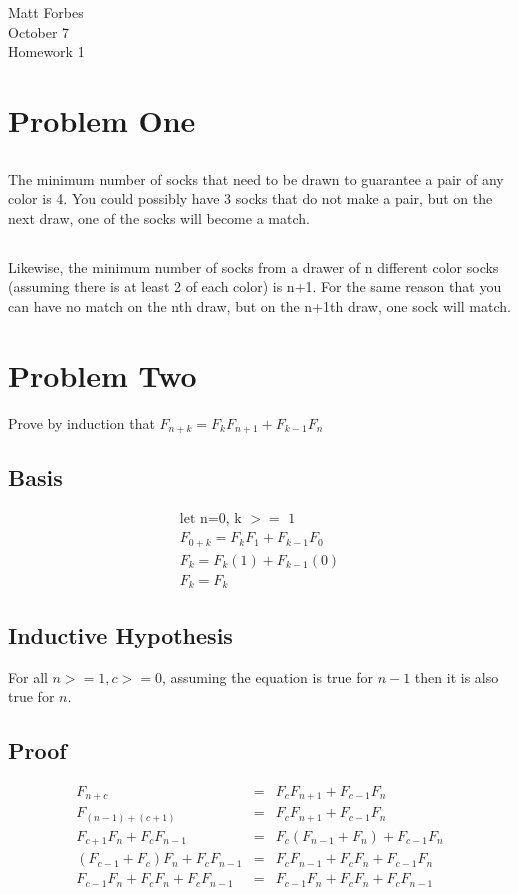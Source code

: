 \documentclass[a4paper,12pt]{article}
\begin{document}
\noindent Matt Forbes \\
October 7 \\
Homework 1 \\


\section{Problem One}
\subsection{}
The minimum number of socks that need to be drawn to guarantee a pair of any color is 4.
You could possibly have 3 socks that do not make a pair, but on the next draw, one of the 
socks will become a match.
\subsection{}
Likewise, the minimum number of socks from a drawer of n different color socks (assuming there is at least 2 of each color)
is n+1. For the same reason that you can have no match on the nth draw, but on the n+1th draw, one sock will match.

\section{Problem Two}
Prove by induction that \(F_{n+k} = F_kF_{n+1} + F_{k-1}F_n\)
\subsection{Basis}
\begin{align*}
  \text{let n=0, k \(>=\) 1} \\
  F_{0+k} = F_kF_1 + F_{k-1}F_0 \\
  F_k = F_k(1) + F_{k-1}(0) \\
  F_k = F_k
\end{align*}

\subsection{Inductive Hypothesis}
For all \(n >= 1, c >= 0 \), assuming the equation is true for \(n-1\) then it 
is also true for \(n\).

\subsection{Proof}
\begin{eqnarray*}
  F_{n+c} &=& F_cF_{n+1} + F_{c-1}F_n \\
  F_{(n-1) + (c+1)} &=& F_cF_{n+1} + F_{c-1}F_n \\
  F_{c+1}F_n + F_cF_{n-1} &=& F_c(F_{n-1} + F_n) + F_{c-1}F_n \\
  (F_{c-1} + F_c)F_n + F_cF_{n-1} &=& F_cF_{n-1} + F_cF_n + F_{c-1}F_n \\
  F_{c-1}F_n + F_cF_n + F_cF_{n-1} &=& F_{c-1}F_n + F_cF_n + F_cF_{n-1} \\
\end{eqnarray*}
\end{document}
